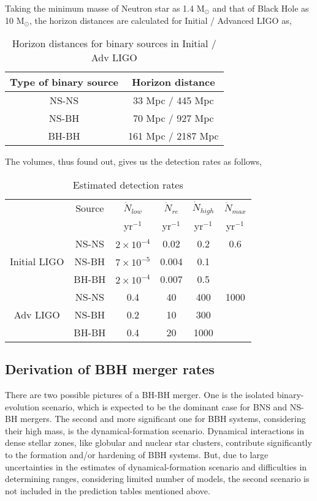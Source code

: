 \documentclass{article}
\numberwithin{equation}{section}
\begin{document}
Taking the minimum masse of Neutron star as 1.4 M$_\odot$ and that of Black Hole as 10 M$_\odot$, the horizon distances are calculated for Initial / Advanced LIGO as,

\begin{table}[h!]
	\centering
	\caption{Horizon distances for binary sources in Initial / Adv LIGO}
	\label{tab:table1}
	\begin{tabular}{cc}
		\toprule
		Type of binary source & Horizon distance\\
		\midrule
		NS-NS & 33 Mpc / 445 Mpc\\
		NS-BH & 70 Mpc / 927 Mpc\\
		BH-BH & 161 Mpc / 2187 Mpc\\
		\bottomrule
	\end{tabular}
\end{table}

The volumes, thus found out, gives us the detection rates as follows,

\begin{table}[h!]
	\centering
	\caption{Estimated detection rates}
	\label{tab:table1}
	\begin{tabular}{cccccc}
		\toprule
		 & Source & $\dot{N}_{low}$ & $\dot{N}_{re}$ & $\dot{N}_{high}$ & $\dot{N}_{max}$\\
		 & & yr$^{-1}$ & yr$^{-1}$ & yr$^{-1}$ & yr$^{-1}$\\
		
		\midrule
		 & NS-NS & $2 \times 10^{-4}$ & 0.02 & 0.2 & 0.6\\
		Initial LIGO & NS-BH & $7 \times 10^{-5}$ & 0.004 & 0.1 & \\
		 & BH-BH & $2 \times 10^{-4}$ & 0.007 & 0.5 & \\
		
		\midrule
		& NS-NS & 0.4 & 40 & 400 & 1000\\
		Adv LIGO & NS-BH & 0.2 & 10 & 300 & \\
		& BH-BH & 0.4 & 20 & 1000 & \\
		\bottomrule
	\end{tabular}
\end{table}

\subsection*{\normalsize{Derivation of BBH merger rates}}
There are two possible pictures of a BH-BH merger. One is the isolated binary-evolution scenario, which is expected to be the dominant case for BNS and NS-BH mergers. The second and more significant one for BBH systems, considering their high mass, is the dynamical-formation scenario. Dynamical interactions in dense stellar zones, like globular and nuclear star clusters, contribute significantly to the formation and/or hardening of BBH systems. But, due to large uncertainties in the estimates of dynamical-formation scenario and difficulties in determining ranges, considering limited number of models, the second scenario is not included in the prediction tables mentioned above.
\end{document}
